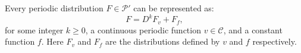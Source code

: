 Every periodic distribution $F \in \mathcal{P}'$ can be represented as:
\[
F = D^k F_v + F_f,
\]
for some integer $k \geq 0$, a continuous periodic function $v \in \mathcal{C}$, and a constant function $f$. Here $F_v$ and $F_f$ are the distributions defined by $v$ and $f$ respectively.
